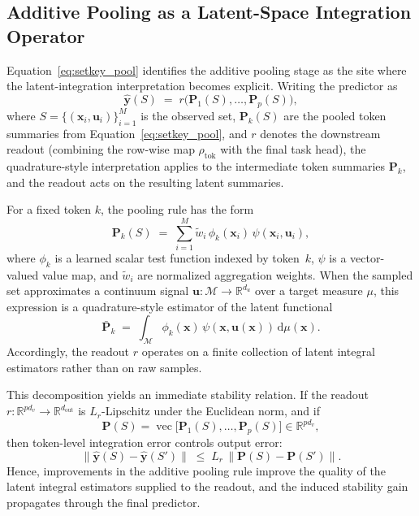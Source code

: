 \documentclass[11pt]{article}
\begin{document}
\subsection{Additive Pooling as a Latent-Space Integration Operator}
\label{sec:method-quadrature}

Equation~\eqref{eq:setkey_pool} identifies the additive pooling stage as the
site where the latent-integration interpretation becomes explicit.  Writing the
predictor as
\[
  \widehat{\boldsymbol{y}}(S)
  \;=\;
  r\!\bigl(\boldsymbol{P}_1(S),\dots,\boldsymbol{P}_p(S)\bigr),
\]
where $S=\{(\boldsymbol{x}_i,\boldsymbol{u}_i)\}_{i=1}^M$ is the observed set,
$\boldsymbol{P}_k(S)$ are the pooled token summaries from
Equation~\eqref{eq:setkey_pool}, and $r$ denotes the downstream readout
(combining the row-wise map $\rho_{\mathrm{tok}}$ with the final task head),
the quadrature-style interpretation applies to the intermediate token summaries
$\boldsymbol{P}_k$, and the readout acts on the resulting latent summaries.

For a fixed token $k$, the pooling rule has the form
\begin{equation}
  \boldsymbol{P}_k(S)
  \;=\;
  \sum_{i=1}^M \tilde w_i\,\phi_k(\boldsymbol{x}_i)\,\psi(\boldsymbol{x}_i,\boldsymbol{u}_i),
\end{equation}
where $\phi_k$ is a learned scalar test function indexed by token~$k$,
$\psi$ is a vector-valued value map, and $\tilde w_i$ are normalized
aggregation weights.  When the sampled set approximates a continuum signal
$\boldsymbol{u}:\mathcal{M}\to\mathbb{R}^{d_u}$ over a target measure $\mu$,
this expression is a quadrature-style estimator of the latent functional
\begin{equation}
  \bar{\boldsymbol{P}}_k
  \;=\;
  \int_{\mathcal{M}}
    \phi_k(\boldsymbol{x})\,
    \psi(\boldsymbol{x},\boldsymbol{u}(\boldsymbol{x}))\,
    \mathrm{d}\mu(\boldsymbol{x}).
\end{equation}
Accordingly, the readout $r$ operates on a finite collection of latent integral
estimators rather than on raw samples.

This decomposition yields an immediate stability relation.  If the readout
$r:\mathbb{R}^{p d_v}\to\mathbb{R}^{d_{\mathrm{out}}}$ is
$L_r$-Lipschitz under the Euclidean norm, and if
\[
  \mathbf{P}(S)
  =
  \operatorname{vec}\bigl[\boldsymbol{P}_1(S),\dots,\boldsymbol{P}_p(S)\bigr]
  \in \mathbb{R}^{p d_v},
\]
then token-level integration error controls output error:
\[
  \|\widehat{\boldsymbol{y}}(S)-\widehat{\boldsymbol{y}}(S')\|
  \;\le\;
  L_r\,
  \bigl\|
    \mathbf{P}(S)-\mathbf{P}(S')
  \bigr\|.
\]
Hence, improvements in the additive pooling rule improve the quality of the
latent integral estimators supplied to the readout, and the induced stability
gain propagates through the final predictor.
\end{document}
